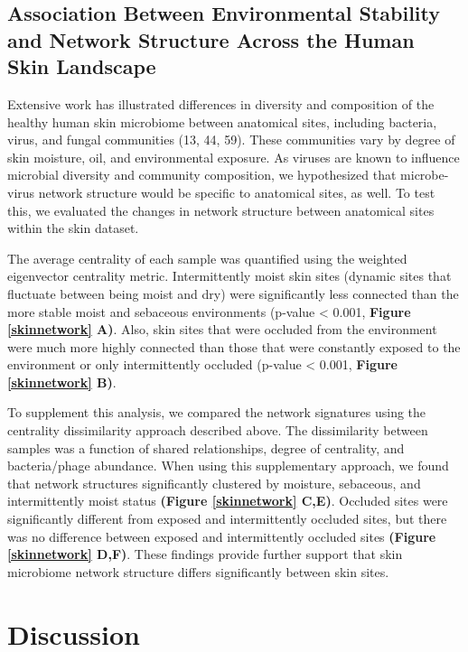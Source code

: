 \documentclass[12pt,]{article}
\begin{document}
\subsection{Association Between Environmental Stability and Network
Structure Across the Human Skin
Landscape}\label{association-between-environmental-stability-and-network-structure-across-the-human-skin-landscape}

Extensive work has illustrated differences in diversity and composition
of the healthy human skin microbiome between anatomical sites, including
bacteria, virus, and fungal communities (13, 44, 59). These communities
vary by degree of skin moisture, oil, and environmental exposure. As
viruses are known to influence microbial diversity and community
composition, we hypothesized that microbe-virus network structure would
be specific to anatomical sites, as well. To test this, we evaluated the
changes in network structure between anatomical sites within the skin
dataset.

The average centrality of each sample was quantified using the weighted
eigenvector centrality metric. Intermittently moist skin sites (dynamic
sites that fluctuate between being moist and dry) were significantly
less connected than the more stable moist and sebaceous environments
(p-value \textless{} 0.001, \textbf{Figure \ref{skinnetwork} A)}. Also,
skin sites that were occluded from the environment were much more highly
connected than those that were constantly exposed to the environment or
only intermittently occluded (p-value \textless{} 0.001, \textbf{Figure
\ref{skinnetwork} B)}.

To supplement this analysis, we compared the network signatures using
the centrality dissimilarity approach described above. The dissimilarity
between samples was a function of shared relationships, degree of
centrality, and bacteria/phage abundance. When using this supplementary
approach, we found that network structures significantly clustered by
moisture, sebaceous, and intermittently moist status \textbf{(Figure
\ref{skinnetwork} C,E)}. Occluded sites were significantly different
from exposed and intermittently occluded sites, but there was no
difference between exposed and intermittently occluded sites
\textbf{(Figure \ref{skinnetwork} D,F)}. These findings provide further
support that skin microbiome network structure differs significantly
between skin sites.

\section{Discussion}\label{discussion}
\end{document}

